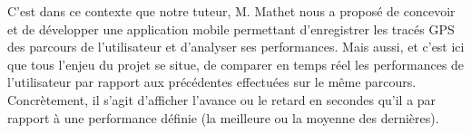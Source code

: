 C'est dans ce contexte que notre tuteur, M. Mathet nous a proposé de concevoir et de développer une application mobile permettant d'enregistrer les tracés GPS des parcours de l'utilisateur et d'analyser ses performances. Mais aussi, et c'est ici que tous l'enjeu du projet se situe, de comparer en temps réel les performances de l'utilisateur par rapport aux  précédentes effectuées sur le même parcours. Concrètement, il s'agit d'afficher l'avance ou le retard en secondes qu'il a par rapport à une performance définie (la meilleure ou la moyenne des dernières). 

